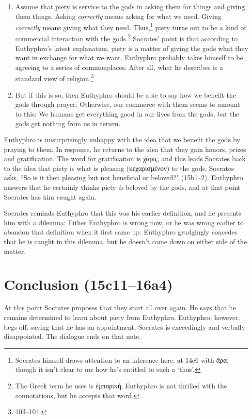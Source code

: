 \documentclass[11pt]{article}
\begin{document}
\begin{enumerate}
    \item Assume that piety is service to the gods in asking them for things and giving them things.  Asking \emph{correctly} means asking for what we need.  Giving \emph{correctly} means giving what they need.  Thus,\footnote{Socrates himself draws attention to an inference here, at 14e6 with ἄρα, though it isn't clear to me how he's entitled to such a `thus'.} piety turns out to be a kind of commercial interaction with the gods.\footnote{The Greek term he uses is ἐμπορική.  Euthyphro is not thrilled with the connotations, but he accepts that word.}  Socrates' point is that according to Euthyphro's latest explanation, piety is a matter of giving the gods what they want in exchange for what we want.  Euthyphro probably takes himself to be agreeing to a series of commonplaces.  After all, what he describes is a standard  view of religion.\footnote{\citet{bailly2003} 103--104.}
    \item But if this is so, then Euthyphro should be able to say how we benefit the gods through prayer.  Otherwise, our commerce with them seems to amount to this: We humans get everything good in our lives from the gods, but the gods get nothing from us in return.
\end{enumerate}

Euthyphro is unsurprisingly unhappy with the idea that we benefit the gods by praying to them. In response, he returns to the idea that they gain honors, prizes and gratification.  The word for gratification is χάρις, and this leads Socrates back to the idea that piety is what is pleasing (κεχαρισμένον) to the gods.  Socrates asks, ``So is it then pleasing but not beneficial or beloved?" (15b1--2).  Euthyphro answers that he certainly thinks piety \emph{is} beloved by the gods, and at that point Socrates has him caught again.

Socrates reminds Euthyphro that this was his earlier definition, and he presents him with a dilemma: Either Euthyphro is wrong now, or he was wrong earlier to abandon that definition when it first came up.  Euthyphro grudgingly concedes that he is caught in this dilemma, but he doesn't come down on either side of the matter.

\section{Conclusion (15c11--16a4)}

At this point Socrates proposes that they start all over again.  He says that he remains determined to learn about piety from Euthyphro.  Euthyphro, however, begs off, saying that he has an appointment.  Socrates is exceedingly and verbally disappointed. The dialogue ends on that note.

\newpage


\end{document}
